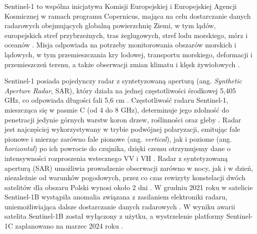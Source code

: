 \documentclass{amuthesis}
\begin{document}
Sentinel-1 to wspólna inicjatywa Komisji Europejskiej i Europejskiej
Agencji Kosmicznej w ramach programu Copernicus, mająca na celu
dostarczanie danych radarowych obejmujących globalną powierzchnię Ziemi,
w tym lądów, europejskich stref przybrzeżnych, tras żeglugowych, stref
lodu morskiego, mórz i oceanów
\autocite{hejmanowska_2020_dane,sentinel1_mission_objectives}. Misja
odpowiada na potrzeby monitorowania obszarów morskich i lądowych, w tym
przemieszczania kry lodowej, transportu morskiego, deformacji i
przemieszczeń terenu, a także obserwacji zmian klimatu i klęsk
żywiołowych
\autocite{hejmanowska_2020_dane,sentinel1_mission_objectives}.

Sentinel-1 posiada pojedynczy radar z syntetyzowaną aperturą (ang.
\emph{Synthetic Aperture Radar}, SAR), który działa na jednej
częstotliwości środkowej 5,405 GHz, co odpowiada długości fali 5,6 cm
\autocite{sentinel1_lulc,sentinel1_instrument_payload}. Częstotliwość
radaru Sentinel-1, mieszcząca się w pasmie C (od 4 do 8 GHz),
determinuje jego zdolność do penetracji jedynie górnych warstw koron
drzew, roślinności oraz gleby \autocite{sentinel_1_user_guide}. Radar
jest najczęściej wykorzystywany w trybie podwójnej polaryzacji, emitując
fale pionowe i mierząc zarówno fale pionowe (ang. \emph{vertical}), jak
i poziome (ang. \emph{horizontal}) po ich powrocie do czujnika, dzięki
czemu otrzymujemy dane o intensywności rozproszenia wstecznego VV i VH
\autocite{sentinel1_lulc}. Radar z syntetyzowaną aperturą (SAR)
umożliwia prowadzenie obserwacji zarówno w nocy, jak i w dzień,
niezależnie od warunków pogodowych, przez co czas rewizyty konstelacji
dwóch satelitów dla obszaru Polski wynosi około 2 dni
\autocite{attema_2008_s1,sentinel1_revisit}. W grudniu 2021 roku w
satelicie Sentinel-1B wystąpiła anomalia związana z zasilaniem
elektroniki radaru, uniemożliwiająca dalsze dostarczanie danych
radarowych \autocite{sentinel_1b}. W wyniku awarii satelita Sentinel-1B
został wyłączony z użytku, a wystrzelenie platformy Sentinel-1C
zaplanowano na marzec 2024 roku
\autocite{sentinel_1b,sentinel1_eoportal}.
\end{document}
